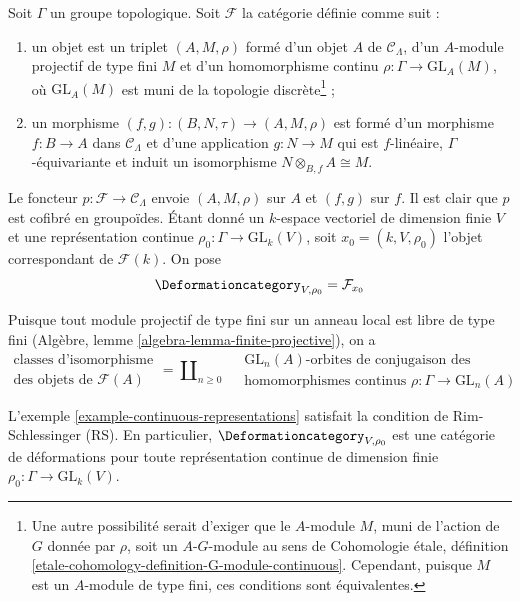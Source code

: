 \begin{example}
\label{example-continuous-representations}
Soit $\Gamma$ un groupe topologique.
Soit $\mathcal{F}$ la catégorie définie comme suit :
\begin{enumerate}
\item un objet est un triplet $(A, M, \rho)$ formé d'un
objet $A$ de $\mathcal{C}_\Lambda$, d'un $A$-module projectif de type fini $M$
et d'un homomorphisme continu $\rho : \Gamma \to \text{GL}_A(M)$,
où $\text{GL}_A(M)$ est muni de la topologie discrète\footnote{Une autre possibilité
serait d'exiger que le $A$-module $M$, muni de l'action de $G$ donnée par $\rho$,
soit un $A\text{-}G$-module au sens de Cohomologie étale, définition
\ref{etale-cohomology-definition-G-module-continuous}. Cependant,
puisque $M$ est un $A$-module de type fini, ces conditions sont équivalentes.} ;
\item un morphisme $(f, g) : (B, N, \tau) \to (A, M, \rho)$ est formé d'un
morphisme $f : B \to A$ dans $\mathcal{C}_\Lambda$ et
d'une application $g : N \to M$ qui est $f$-linéaire, $\Gamma$-équivariante
et induit un isomorphisme $N \otimes_{B, f} A \cong M$.
\end{enumerate}
Le foncteur $p : \mathcal{F} \to \mathcal{C}_\Lambda$ envoie $(A, M, \rho)$
sur $A$ et $(f, g)$ sur $f$. Il est clair que $p$ est cofibré en groupoïdes.
Étant donné un $k$-espace vectoriel de dimension finie $V$ et une
représentation continue $\rho_0 : \Gamma \to \text{GL}_k(V)$,
soit $x_0 = (k, V, \rho_0)$ l'objet correspondant de $\mathcal{F}(k)$.
On pose
$$
\Deformationcategory_{V, \rho_0} = \mathcal{F}_{x_0}
$$
\end{example}

\noindent
Puisque tout module projectif de type fini sur un anneau local est libre
de type fini (Algèbre, lemme \ref{algebra-lemma-finite-projective}),
on a
$$
\begin{matrix}
\text{classes d'isomorphisme} \\
\text{des objets de }\mathcal{F}(A)
\end{matrix}
=
\coprod\nolimits_{n \geq 0}\quad
\begin{matrix}
\text{GL}_n(A)\text{-orbites de conjugaison des}\\
\text{homomorphismes continus }\rho : \Gamma \to \text{GL}_n(A)
\end{matrix}
$$

\begin{lemma}
\label{lemma-continuous-representations-RS}
L'exemple \ref{example-continuous-representations}
satisfait la condition de Rim-Schlessinger (RS).
En particulier, $\Deformationcategory_{V, \rho_0}$ est une catégorie de déformations
pour toute représentation continue de dimension finie
$\rho_0 : \Gamma \to \text{GL}_k(V)$.
\end{lemma}


